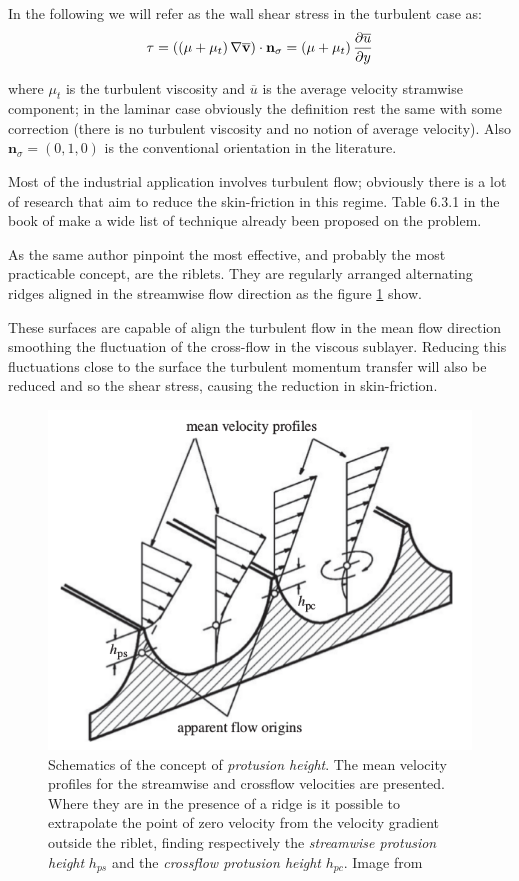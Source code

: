 In the following we will refer as the wall shear stress in the turbulent case as:
\begin{equation}
\tau = \left( \left( \mu + \mu_t \right)  \nabla \mathbf{\overline{v}} \right) \cdot  \mathbf{n}_{\sigma} = \left( \mu + \mu_t \right) \frac{\partial \overline{u}}{\partial y}
\end{equation}

where $\mu_t$ is the turbulent viscosity and $\overline{u}$ is the average velocity stramwise component; in the laminar case obviously the definition rest the same with some correction (there is no turbulent viscosity and no notion of average velocity).
Also $\mathbf{n}_{\sigma} = (0,1,0)$ is the conventional orientation in the literature.

Most of the industrial application involves turbulent flow; obviously there is a lot of research that aim to reduce the skin-friction in this regime.
Table 6.3.1 in the book of \citet{mclean2012understanding} make a wide list of technique already been proposed on the problem.

As the same author pinpoint the most effective, and probably the most practicable concept, are the riblets.
They are regularly arranged alternating ridges aligned in the streamwise flow direction as the figure \ref{fig:riblets1} show.

These surfaces are capable of align the turbulent flow in the mean flow direction smoothing the fluctuation of the cross-flow in the viscous sublayer.
Reducing this fluctuations close to the surface the turbulent momentum transfer will also be reduced and so the shear stress, causing the reduction in skin-friction.

\begin{figure}[h]
	\centering
	\includegraphics[width=0.7\linewidth]{chapter_1/riblets3}
	\caption{Schematics of the concept of \textit{protusion height}. The mean velocity profiles for the streamwise and crossflow velocities are presented. Where they are in the presence of a ridge is it possible to extrapolate the point of zero velocity from the velocity gradient outside the riblet, finding respectively the \textit{streamwise protusion height} $h_{ps}$ and the \textit{crossflow protusion height} $h_{pc}$. Image from \citet{bechert1997experiments}}
	\label{fig:riblets1}
\end{figure}


